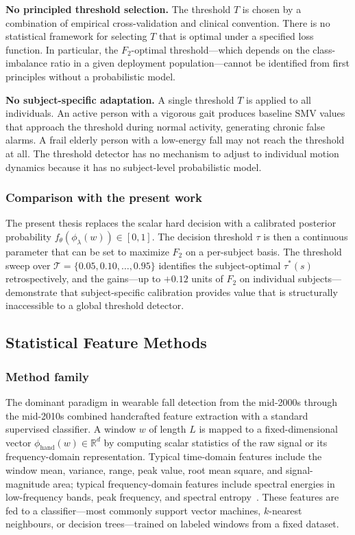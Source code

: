 \documentclass[onluarkali,ingilizce,yukseklisans,karton,LisansustuEgitim]{itutez}
\providecommand{\R}{\mathbb{R}}
\providecommand{\1}{\mathbf{1}}
\begin{document}
\textbf{No principled threshold selection.}  The threshold $T$ is chosen by a
combination of empirical cross-validation and clinical convention.  There is no
statistical framework for selecting $T$ that is optimal under a specified loss
function.  In particular, the $F_2$-optimal threshold---which depends on the
class-imbalance ratio in a given deployment population---cannot be identified from
first principles without a probabilistic model.

\textbf{No subject-specific adaptation.}  A single threshold $T$ is applied to all
individuals.  An active person with a vigorous gait produces baseline $\mathrm{SMV}$
values that approach the threshold during normal activity, generating chronic false
alarms.  A frail elderly person with a low-energy fall may not reach the threshold
at all.  The threshold detector has no mechanism to adjust to individual motion
dynamics because it has no subject-level probabilistic model.

\subsubsection{Comparison with the present work}

The present thesis replaces the scalar hard decision with a calibrated posterior
probability $f_\theta(\phi_\lambda(w)) \in [0,1]$.  The decision threshold $\tau$
is then a continuous parameter that can be set to maximize $F_2$ on a per-subject
basis.  The threshold sweep over
$\mathcal{T}=\{0.05,0.10,\ldots,0.95\}$ identifies the subject-optimal $\tau^*(s)$
retrospectively, and the gains---up to $+0.12$ units of $F_2$ on individual
subjects---demonstrate that subject-specific calibration provides value that is
structurally inaccessible to a global threshold detector.

\subsection{Statistical Feature Methods}
\label{subsec:rw-statistical}

\subsubsection{Method family}

The dominant paradigm in wearable fall detection from the mid-2000s through the
mid-2010s combined handcrafted feature extraction with a standard supervised
classifier.  A window $w$ of length $L$ is mapped to a fixed-dimensional vector
$\phi_{\mathrm{hand}}(w)\in\R^d$ by computing scalar statistics of the raw signal
or its frequency-domain representation.  Typical time-domain features include the
window mean, variance, range, peak value, root mean square, and signal-magnitude
area; typical frequency-domain features include spectral energies in low-frequency
bands, peak frequency, and spectral entropy~\parencite{igual2013challenges,
delahoz2014survey}.  These features are fed to a classifier---most commonly
support vector machines, $k$-nearest neighbours, or decision trees---trained on
labeled windows from a fixed dataset.
\end{document}
